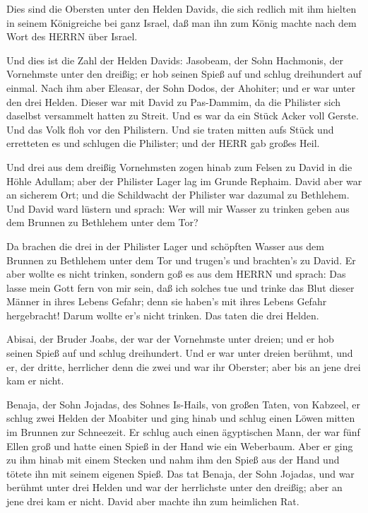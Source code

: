  Dies sind die Obersten unter den Helden Davids, die sich
redlich mit ihm hielten in seinem Königreiche bei ganz Israel, daß man
ihn zum König machte nach dem Wort des HERRN über Israel.

 Und dies ist die Zahl der Helden Davids: Jasobeam, der
Sohn Hachmonis, der Vornehmste unter den dreißig; er hob seinen Spieß
auf und schlug dreihundert auf einmal.  Nach ihm aber
Eleasar, der Sohn Dodos, der Ahohiter; und er war unter den drei Helden.
 Dieser war mit David zu Pas-Dammim, da die Philister sich
daselbst versammelt hatten zu Streit. Und es war da ein Stück Acker voll
Gerste. Und das Volk floh vor den Philistern.  Und sie
traten mitten aufs Stück und erretteten es und schlugen die Philister;
und der HERR gab großes Heil.

 Und drei aus dem dreißig Vornehmsten zogen hinab zum
Felsen zu David in die Höhle Adullam; aber der Philister Lager lag im
Grunde Rephaim.  David aber war an sicherem Ort; und die
Schildwacht der Philister war dazumal zu Bethlehem.  Und
David ward lüstern und sprach: Wer will mir Wasser zu trinken geben aus
dem Brunnen zu Bethlehem unter dem Tor?

 Da brachen die drei in der Philister Lager und schöpften
Wasser aus dem Brunnen zu Bethlehem unter dem Tor und trugen's und
brachten's zu David. Er aber wollte es nicht trinken, sondern goß es aus
dem HERRN  und sprach: Das lasse mein Gott fern von mir
sein, daß ich solches tue und trinke das Blut dieser Männer in ihres
Lebens Gefahr; denn sie haben's mit ihres Lebens Gefahr hergebracht!
Darum wollte er's nicht trinken. Das taten die drei Helden.

 Abisai, der Bruder Joabs, der war der Vornehmste unter
dreien; und er hob seinen Spieß auf und schlug dreihundert. Und er war
unter dreien berühmt,  und er, der dritte, herrlicher denn
die zwei und war ihr Oberster; aber bis an jene drei kam er nicht.

 Benaja, der Sohn Jojadas, des Sohnes Is-Hails, von großen
Taten, von Kabzeel, er schlug zwei Helden der Moabiter und ging hinab
und schlug einen Löwen mitten im Brunnen zur Schneezeit. 
Er schlug auch einen ägyptischen Mann, der war fünf Ellen groß und hatte
einen Spieß in der Hand wie ein Weberbaum. Aber er ging zu ihm hinab mit
einem Stecken und nahm ihm den Spieß aus der Hand und tötete ihn mit
seinem eigenen Spieß.  Das tat Benaja, der Sohn Jojadas,
und war berühmt unter drei Helden  und war der herrlichste
unter den dreißig; aber an jene drei kam er nicht. David aber machte ihn
zum heimlichen Rat.

